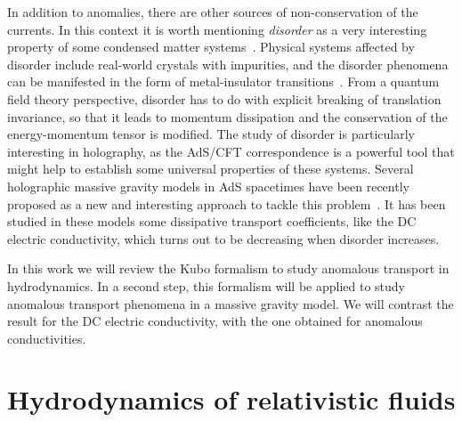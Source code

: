 \documentclass[a4paper]{jpconf}
\begin{document}
In addition to anomalies, there are other sources of non-conservation of the currents. In this context it is worth mentioning {\it disorder} as a very interesting property of some condensed matter systems~\cite{Lee:1985zzc}. Physical systems affected by disorder include real-world crystals with impurities, and the disorder phenomena can be manifested in the form of metal-insulator transitions~\cite{Imada:1998zz}. From a quantum field theory perspective, disorder has to do with explicit breaking of translation invariance, so that it leads to momentum dissipation and the conservation of the energy-momentum tensor is modified.  The study of disorder is particularly interesting in holography, as the AdS/CFT correspondence is a powerful tool that might help to establish some universal properties of these systems. Several holographic massive gravity models in AdS spacetimes have been recently proposed as a new and interesting approach to tackle this problem~\cite{Baggioli:2016oqk,Gouteraux:2016wxj}. It has been studied in these models some dissipative transport coefficients, like the DC electric conductivity, which turns out to be decreasing when disorder increases.

In this work we will review the Kubo formalism to study anomalous transport in hydrodynamics. In a second step, this formalism will be applied to study anomalous transport phenomena in a massive gravity model. We will contrast the result for the DC electric conductivity, with the one obtained for anomalous conductivities.


\section{Hydrodynamics of relativistic fluids}
\label{sec:hydro}
\end{document}
